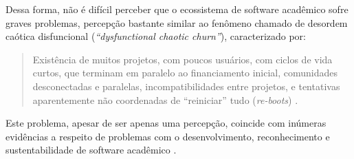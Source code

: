 Dessa forma, não é difícil perceber que o ecossistema de software acadêmico sofre graves
problemas, percepção bastante similar ao fenômeno chamado de  desordem
caótica disfuncional ({\it ``dysfunctional chaotic churn''}), caracterizado
por:

\begin{quote}
Existência de muitos projetos, com poucos usuários, com
ciclos de vida curtos, que terminam em paralelo ao financiamento inicial,
comunidades desconectadas e paralelas, incompatibilidades entre projetos, e
tentativas aparentemente não coordenadas de ``reiniciar'' tudo ({\it re-boots})
\cite{howison2015understanding}.
\end{quote}

Este problema, apesar de ser apenas uma percepção, coincide com inúmeras
evidências a respeito de problemas com o desenvolvimento, reconhecimento e
sustentabilidade de software acadêmico \cite{allen2017engineering}.

